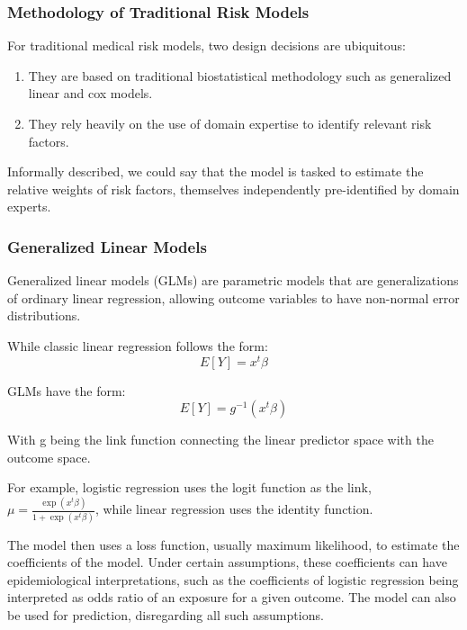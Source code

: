 \documentclass[a4paper,12pt]{article}
\begin{document}
			\subsubsection{Methodology of Traditional Risk Models}
		
			For traditional medical risk models, two design decisions are ubiquitous\cite{Weng2017}:
			\begin{enumerate}
				\item They are based on traditional biostatistical methodology such as generalized linear and cox models.
				\item They rely heavily on the use of domain expertise to identify relevant risk factors.
			\end{enumerate}
		
			Informally described, we could say that the model is tasked to estimate the relative weights of risk factors, themselves independently pre-identified by domain experts.
		
			\subsubsection{Generalized Linear Models}
			
			Generalized linear models (GLMs) are parametric models that are generalizations of ordinary linear regression, allowing outcome variables to have non-normal error distributions\cite{Nelder1972}.
			
			While classic linear regression follows the form:
			\begin{equation*}
			E[Y] = x^t \beta
			\end{equation*}
			
			GLMs have the form:
			\begin{equation*}
			E[Y] = g^{-1} (x^t \beta)
			\end{equation*}
			
			With g being the link function connecting the linear predictor space with the outcome space.
			
			For example, logistic regression uses the logit function as the link, $ \mu = \frac{\exp (x^t \beta)}{1 + \exp (x^t \beta)} $, while linear regression uses the identity function.
			
			The model then uses a loss function, usually maximum likelihood, to estimate the coefficients of the model. Under certain assumptions, these coefficients can have epidemiological interpretations, such as the coefficients of logistic regression being interpreted as odds ratio of an exposure for a given outcome. The model can also be used for prediction, disregarding all such assumptions.
			
\end{document}
